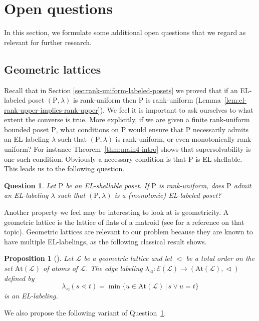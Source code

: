 \documentclass[11pt,a4paper]{amsart}
\theoremstyle{results}
\newtheorem{proposition}[thm]{Proposition}
\theoremstyle{definitions}
\newtheorem{question}[thm]{Question}
\def\P{\mathbb{P}}
\renewcommand{\L}{\mathcal{L}}
\newcommand{\At}{\mathrm{At}}
\newcommand{\Edge}{\mathcal{E}}
\renewcommand{\L}{\mathcal{L}}
\renewcommand{\P}{\mathrm{P}}
\begin{document}
\section{Open questions}
\label{sec:open-questions}
In this section, we formulate some additional open questions that we regard as relevant for further research. 
\subsection{Geometric lattices}
Recall that in Section \ref{sec:rank-uniform-labeled-posets} we proved that if an EL-labeled poset $(\P, \lambda)$ is rank-uniform then $\P$ is rank-uniform (Lemma~\ref{lem:el-rank-upper-implies-rank-upper}). We feel it is important to ask ourselves to what extent the converse is true. More explicitly, if we are given a finite rank-uniform bounded poset $\P$, what conditions on $\P$ would ensure that $\P$ necessarily admits an EL-labeling $\lambda$ such that $(\P, \lambda)$ is rank-uniform, or even monotonically rank-uniform? For instance Theorem~\ref{thm:main4-intro} shows that supersolvability is one such condition. Obviously a necessary condition is that $\P$ is EL-shellable. This leads us to the following question. 
\begin{question}\label{question:rank-upper-labeled}
Let $\P$ be an EL-shellable poset. If $\P$ is rank-uniform, does $\P$ admit an EL-labeling $\lambda$ such that $(\P, \lambda)$ is a (monotonic) EL-labeled poset?  
\end{question}

Another property we feel may be interesting to look at is geometricity. A geometric lattice is the lattice of flats of a matroid (see \cite{oxley2006matroid} for a reference on that topic). Geometric lattices are relevant to our problem because they are known to have multiple EL-labelings, as the following classical result shows. 
\begin{proposition}[\cite{bjorner-el-shellable}]
Let $\L$ be a geometric lattice and let $\vartriangleleft$ be a total order on the set $\At(\L)$ of atoms of $\L$. The edge labeling  $\lambda_{\vartriangleleft} : \Edge(\L) \rightarrow (\At(\L), \vartriangleleft)$ defined by
\begin{equation*}
    \lambda_{\vartriangleleft}(s\lessdot t) = \min \{ u \in \At(\L) \, | \, s\vee u = t \}
\end{equation*}
is an EL-labeling. 
\end{proposition}

We also propose the following variant of Question~\ref{question:rank-upper-labeled}. 
\end{document}
